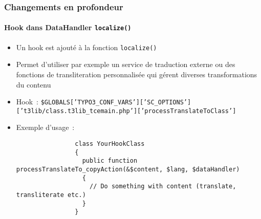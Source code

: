 \begin{frame}[fragile]
	\frametitle{Changements en profondeur}
	\framesubtitle{Hook dans DataHandler \texttt{localize()}}

	\lstset{basicstyle=\tiny\ttfamily}

	\begin{itemize}
		\item Un hook est ajouté à la fonction \texttt{localize()}
		\item Permet d'utiliser par exemple un service de traduction externe ou des
			fonctions de transliteration personnalisée qui gérent diverses transformations
			du contenu
	\end{itemize}

	\begin{itemize}
		\item Hook~:\newline
			\smaller
				\texttt{\$GLOBALS['TYPO3\_CONF\_VARS']['SC\_OPTIONS']\newline
				\tabto{0.4cm}['t3lib/class.t3lib\_tcemain.php']['processTranslateToClass']}
			\normalsize

		\item Exemple d'usage~:

			\begin{lstlisting}
				class YourHookClass
				{
				  public function processTranslateTo_copyAction(&$content, $lang, $dataHandler)
				  {
				    // Do something with content (translate, transliterate etc.)
				  }
				}
			\end{lstlisting}
	\end{itemize}

\end{frame}









